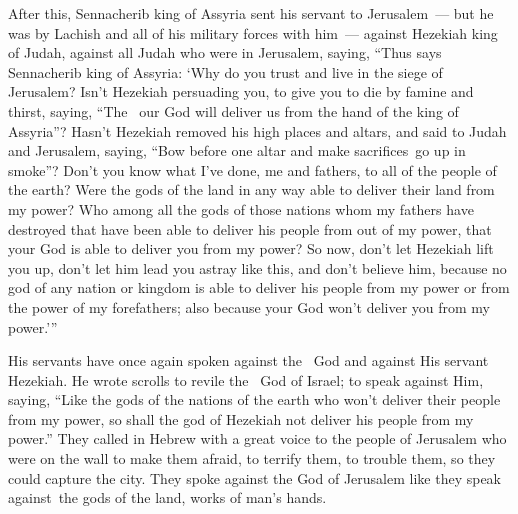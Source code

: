 \begin{inparaenum}
   After this, Sennacherib king of Assyria sent his servant to Jerusalem~--- but he was by Lachish and all of his military forces with him~--- against Hezekiah king of Judah, against all Judah who were in Jerusalem, saying,%
   ``Thus says Sennacherib king of Assyria: `Why do you trust and live in the siege of Jerusalem?%
   Isn't Hezekiah persuading you, to give you to die by famine and thirst, saying, ``The \lord\ our God will deliver us from the hand of the king of Assyria''?%
   Hasn't Hezekiah removed his high places and altars, and said to Judah and Jerusalem, saying, ``Bow before one altar and make sacrifices\understood{}\ go up in smoke''?%
   Don't you know what I've done, me and fathers, to all of the people of the earth? Were the gods of the land in any way able to deliver their land from my power?%
   Who among all the gods of those nations whom my fathers have destroyed that have been able to deliver his people from out of my power, that your God is able to deliver you from my power?%
   So now, don't let Hezekiah lift you up, don't let him lead you astray like this, and don't believe him, because no god of any nation or kingdom is able to deliver his people from my power or from the power of my forefathers; also because your God won't deliver you from my power.'\thinspace''%

   His servants have once again spoken against the \lord\ God and against His servant Hezekiah.%
   He wrote scrolls to revile the \lord\ God of Israel; to speak against Him, saying, ``Like the gods of the nations of the earth who won't deliver their people from my power, so shall the god of Hezekiah not deliver his people from my power.''%
   They called in Hebrew with a great voice to the people of Jerusalem who were on the wall to make them afraid, to terrify them, to trouble them, so they could capture the city.%
   They spoke against the God of Jerusalem like they speak against\understood{}\ the gods of the land, works of man's hands.%


\end{inparaenum}
